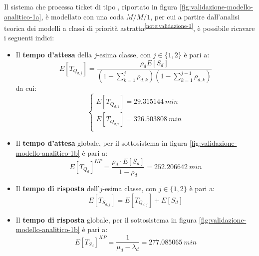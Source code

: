 Il sistema che processa ticket di tipo \sr{}, riportato in figura \ref{fig:validazione-modello-analitico-1a}, è modellato con una coda $M/M/1$, per cui a partire dall'analisi teorica dei modelli a classi di priorità astratta\textsuperscript{\ref{note:validazione-1}}, è possibile ricavare i seguenti indici:
\begin{itemize}
\item Il \textbf{tempo d'attesa} della $j$-esima classe, con $j\in\lbrace 1, 2\rbrace$ è pari a:
\begin{equation}
E[T_{Q_{d,j}}] = \frac{\rho_d E[S_d]}{\left(1- \sum_{k=1}^{j} \rho_{d,k}\right)\left(1- \sum_{k=1}^{j-1} \rho_{d,k}\right)}
\end{equation}
da cui:
\begin{equation}
\begin{cases}
E[T_{Q_{d,1}}] = 29.315144\ min \\[1.5em]
E[T_{Q_{d,2}}] = 326.503808\ min \\[1em]
\end{cases}
\end{equation}
\item Il \textbf{tempo d'attesa} globale, per il sottosistema in figura \ref{fig:validazione-modello-analitico-1b} è pari a:
\begin{equation}
E[T_{Q_d}]^{KP} = \frac{\rho_d \cdot E[S_d]}{1-\rho_d} = 252.206642\ min
\end{equation}
\item Il \textbf{tempo di risposta} dell'$j$-esima classe, con $j\in\lbrace 1, 2\rbrace$ è pari a:
\begin{equation}
E[T_{S_{d,j}}] = E[T_{Q_{d,j}}] + E[S_d]
\end{equation}
\item Il \textbf{tempo di risposta} globale, per il sottosistema in figura \ref{fig:validazione-modello-analitico-1b} è pari a:
\begin{equation}
E[T_{S_d}]^{KP} = \frac{1}{\mu_d - \lambda_d} = 277.085065\ min
\end{equation}
\end{itemize}